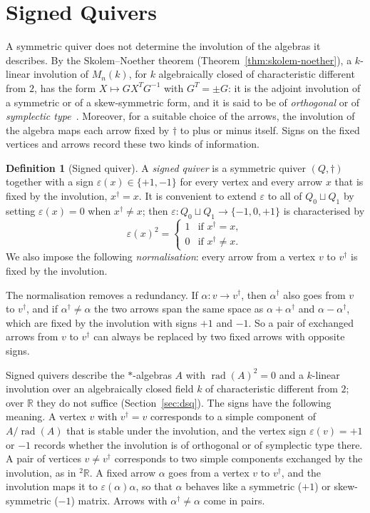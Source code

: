 \documentclass[12pt, a4paper]{report}
\theoremstyle{plain}
\theoremstyle{definition}
\newtheorem{definition}[theorem]{Definition}
\theoremstyle{remark}
\theoremstyle{plain}
\newcommand{\rad}[0]{\operatorname{rad}} %
\newcommand{\RR}{\mathbb{R}}
\newcommand{\twoR}{{}^{2}\mathbb{R}}
\begin{document}
\section{Signed Quivers}
\label{sec:signed_quivers}
A symmetric quiver does not determine the involution of the algebras it describes. By the Skolem--Noether theorem (Theorem~\ref{thm:skolem-noether}), a $k$-linear involution of $M_n(k)$, for $k$ algebraically closed of characteristic different from $2$, has the form $X\mapsto GX^TG^{-1}$ with $G^T=\pm G$: it is the adjoint involution of a symmetric or of a skew-symmetric form, and it is said to be of \emph{orthogonal} or of \emph{symplectic type}~\cite{KMRT1998}. Moreover, for a suitable choice of the arrows, the involution of the algebra maps each arrow fixed by $\dagger$ to plus or minus itself. Signs on the fixed vertices and arrows record these two kinds of information.

\begin{definition}[Signed quiver]\label{def:signed-quiver}
A \emph{signed quiver} is a symmetric quiver $(Q,\dagger)$ together with a sign $\varepsilon(x)\in\{+1,-1\}$ for every vertex and every arrow $x$ that is fixed by the involution, $x^\dagger=x$. It is convenient to extend $\varepsilon$ to all of $Q_0\sqcup Q_1$ by setting $\varepsilon(x)=0$ when $x^\dagger\neq x$; then $\varepsilon:Q_0\sqcup Q_1\to\{-1,0,+1\}$ is characterised by
\[ \varepsilon(x)^2=\begin{cases}1&\text{if }x^\dagger=x,\\0&\text{if }x^\dagger\neq x.\end{cases} \]
We also impose the following \emph{normalisation}: every arrow from a vertex $v$ to $v^\dagger$ is fixed by the involution.
\end{definition}

The normalisation removes a redundancy. If $\alpha:v\to v^\dagger$, then $\alpha^\dagger$ also goes from $v$ to $v^\dagger$, and if $\alpha^\dagger\neq\alpha$ the two arrows span the same space as $\alpha+\alpha^\dagger$ and $\alpha-\alpha^\dagger$, which are fixed by the involution with signs $+1$ and $-1$. So a pair of exchanged arrows from $v$ to $v^\dagger$ can always be replaced by two fixed arrows with opposite signs.

Signed quivers describe the $*$-algebras $A$ with $\rad(A)^2=0$ and a $k$-linear involution over an algebraically closed field $k$ of characteristic different from $2$; over $\RR$ they do not suffice (Section~\ref{sec:dsq}). The signs have the following meaning. A vertex $v$ with $v^\dagger=v$ corresponds to a simple component of $A/\rad(A)$ that is stable under the involution, and the vertex sign $\varepsilon(v)=+1$ or $-1$ records whether the involution is of orthogonal or of symplectic type there. A pair of vertices $v\neq v^\dagger$ corresponds to two simple components exchanged by the involution, as in $\twoR$. A fixed arrow $\alpha$ goes from a vertex $v$ to $v^\dagger$, and the involution maps it to $\varepsilon(\alpha)\alpha$, so that $\alpha$ behaves like a symmetric ($+1$) or skew-symmetric ($-1$) matrix. Arrows with $\alpha^\dagger\neq\alpha$ come in pairs.
\end{document}
